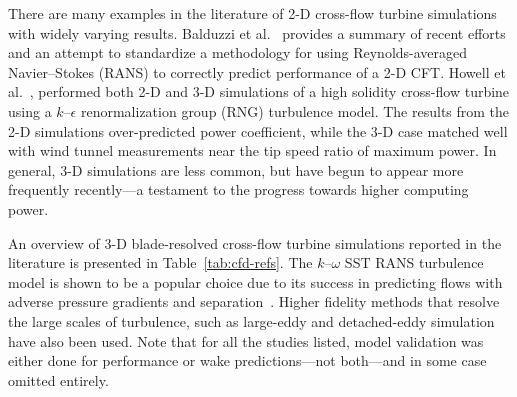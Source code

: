 \documentclass[aip,graphicx]{revtex4-1}
\begin{document}
There are many examples in the literature of 2-D cross-flow turbine simulations
with widely varying results. Balduzzi et al.~\cite{Balduzzi2016} provides
a summary of recent efforts and an attempt to standardize a methodology for
using Reynolds-averaged Navier--Stokes (RANS) to correctly predict performance
of a 2-D CFT. Howell et al.~\cite{Howell2010}, performed both 2-D and 3-D
simulations of a high solidity cross-flow turbine using a $k$--$\epsilon$
renormalization group (RNG) turbulence model. The results from the 2-D
simulations over-predicted power coefficient, while the 3-D case matched well
with wind tunnel measurements near the tip speed ratio of maximum power. In
general, 3-D simulations are less common, but have begun to appear more
frequently recently---a testament to the progress towards higher computing
power.

An overview of 3-D blade-resolved cross-flow turbine simulations reported in the
literature is presented in Table~\ref{tab:cfd-refs}. The $k$--$\omega$ SST RANS
turbulence model is shown to be a popular choice due to its success in
predicting flows with adverse pressure gradients and
separation~\cite{Menter2003}. Higher fidelity methods that resolve the large
scales of turbulence, such as large-eddy and detached-eddy simulation have also
been used. Note that for all the studies listed, model validation was either
done for performance or wake predictions---not both---and in some case omitted
entirely.
\end{document}
